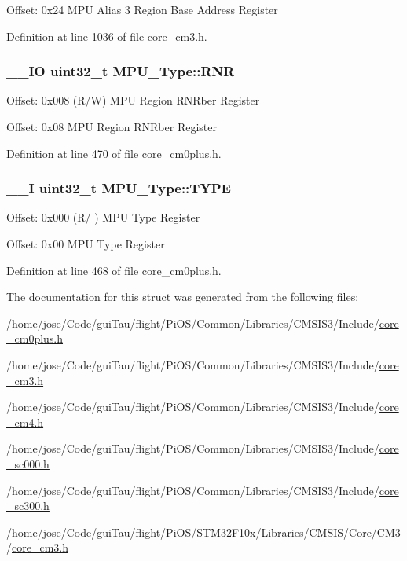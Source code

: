 Offset\-: 0x24 M\-P\-U Alias 3 Region Base Address Register 

Definition at line 1036 of file core\-\_\-cm3.\-h.

\hypertarget{struct_m_p_u___type_afd8de96a5d574c3953e2106e782f9833}{
\subsubsection[{R\-N\-R}]{\setlength{\rightskip}{0pt plus 5cm}\-\_\-\-\_\-\-I\-O {\bf uint32\-\_\-t} M\-P\-U\-\_\-\-Type\-::\-R\-N\-R}}\label{struct_m_p_u___type_afd8de96a5d574c3953e2106e782f9833}
Offset\-: 0x008 (R/\-W) M\-P\-U Region R\-N\-Rber Register

Offset\-: 0x08 M\-P\-U Region R\-N\-Rber Register 

Definition at line 470 of file core\-\_\-cm0plus.\-h.

\hypertarget{struct_m_p_u___type_a6ae8a8c3a4909ae41447168d793608f7}{
\subsubsection[{T\-Y\-P\-E}]{\setlength{\rightskip}{0pt plus 5cm}\-\_\-\-\_\-\-I {\bf uint32\-\_\-t} M\-P\-U\-\_\-\-Type\-::\-T\-Y\-P\-E}}\label{struct_m_p_u___type_a6ae8a8c3a4909ae41447168d793608f7}
Offset\-: 0x000 (R/ ) M\-P\-U Type Register

Offset\-: 0x00 M\-P\-U Type Register 

Definition at line 468 of file core\-\_\-cm0plus.\-h.



The documentation for this struct was generated from the following files\-:\begin{DoxyCompactItemize}
\item 
/home/jose/\-Code/gui\-Tau/flight/\-Pi\-O\-S/\-Common/\-Libraries/\-C\-M\-S\-I\-S3/\-Include/\hyperlink{core__cm0plus_8h}{core\-\_\-cm0plus.\-h}\item 
/home/jose/\-Code/gui\-Tau/flight/\-Pi\-O\-S/\-Common/\-Libraries/\-C\-M\-S\-I\-S3/\-Include/\hyperlink{_common_2_libraries_2_c_m_s_i_s3_2_include_2core__cm3_8h}{core\-\_\-cm3.\-h}\item 
/home/jose/\-Code/gui\-Tau/flight/\-Pi\-O\-S/\-Common/\-Libraries/\-C\-M\-S\-I\-S3/\-Include/\hyperlink{core__cm4_8h}{core\-\_\-cm4.\-h}\item 
/home/jose/\-Code/gui\-Tau/flight/\-Pi\-O\-S/\-Common/\-Libraries/\-C\-M\-S\-I\-S3/\-Include/\hyperlink{core__sc000_8h}{core\-\_\-sc000.\-h}\item 
/home/jose/\-Code/gui\-Tau/flight/\-Pi\-O\-S/\-Common/\-Libraries/\-C\-M\-S\-I\-S3/\-Include/\hyperlink{core__sc300_8h}{core\-\_\-sc300.\-h}\item 
/home/jose/\-Code/gui\-Tau/flight/\-Pi\-O\-S/\-S\-T\-M32\-F10x/\-Libraries/\-C\-M\-S\-I\-S/\-Core/\-C\-M3/\hyperlink{_s_t_m32_f10x_2_libraries_2_c_m_s_i_s_2_core_2_c_m3_2core__cm3_8h}{core\-\_\-cm3.\-h}\end{DoxyCompactItemize}
